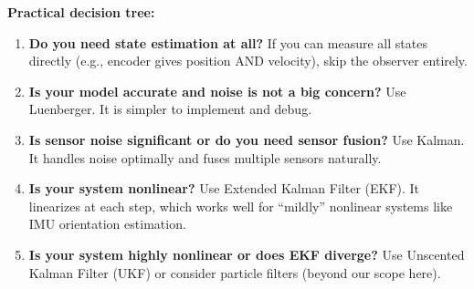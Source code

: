 \textbf{Practical decision tree:}
\begin{enumerate}
    \item \textbf{Do you need state estimation at all?} If you can measure all states directly (e.g., encoder gives position AND velocity), skip the observer entirely.
    \item \textbf{Is your model accurate and noise is not a big concern?} Use Luenberger. It is simpler to implement and debug.
    \item \textbf{Is sensor noise significant or do you need sensor fusion?} Use Kalman. It handles noise optimally and fuses multiple sensors naturally.
    \item \textbf{Is your system nonlinear?} Use Extended Kalman Filter (EKF). It linearizes at each step, which works well for ``mildly'' nonlinear systems like IMU orientation estimation.
    \item \textbf{Is your system highly nonlinear or does EKF diverge?} Use Unscented Kalman Filter (UKF) or consider particle filters (beyond our scope here).
\end{enumerate}


